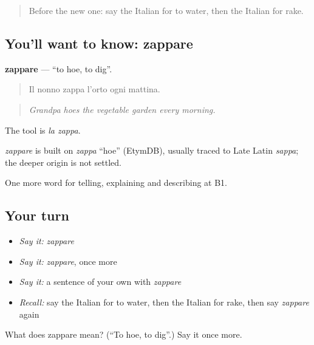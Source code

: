 \label{lesson:IT-C507-zappare}



\begin{quote}
Before the new one: say the Italian for to water, then the Italian for rake.
\end{quote}

\subsection*{You'll want to know: zappare}
\textbf{zappare} — \textquotedblleft{}to hoe, to dig\textquotedblright{}.

\begin{quote}
Il nonno zappa l'orto ogni mattina.
\end{quote}

\begin{quote}
\emph{Grandpa hoes the vegetable garden every morning.}
\end{quote}

The tool is \emph{la zappa}.

\begin{cousinweb}
\emph{zappare} is built on \emph{zappa} \textquotedblleft{}hoe\textquotedblright{} (EtymDB), usually traced to Late Latin \emph{sappa}; the deeper origin is not settled.
\end{cousinweb}

\begin{grammarlens}[title={What you've built}]
One more word for telling, explaining and describing at B1.
\end{grammarlens}

\subsection*{Your turn}
\begin{itemize}
\raggedright
  \item \emph{Say it:} \emph{zappare}
  \item \emph{Say it:} \emph{zappare}, once more
  \item \emph{Say it:} a sentence of your own with \emph{zappare}
  \item \emph{Recall:} say the Italian for to water, then the Italian for rake, then say \emph{zappare} again
\end{itemize}

\begin{tcolorbox}[breakable,colback=teal!4,colframe=teal!35!black,title={Before you move on}]
What does zappare mean? (\textquotedblleft{}To hoe, to dig\textquotedblright{}.) Say it once more.
\end{tcolorbox}
